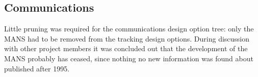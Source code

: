 \subsection{\ac{Communications}}
\label{mtrTOpruneCOM}

Little pruning was required for the communications design option tree: only the MANS had to be removed from the tracking design options.
During discussion with other project members it was concluded out that the development of the MANS probably has ceased, since nothing no new information was found about published after 1995.